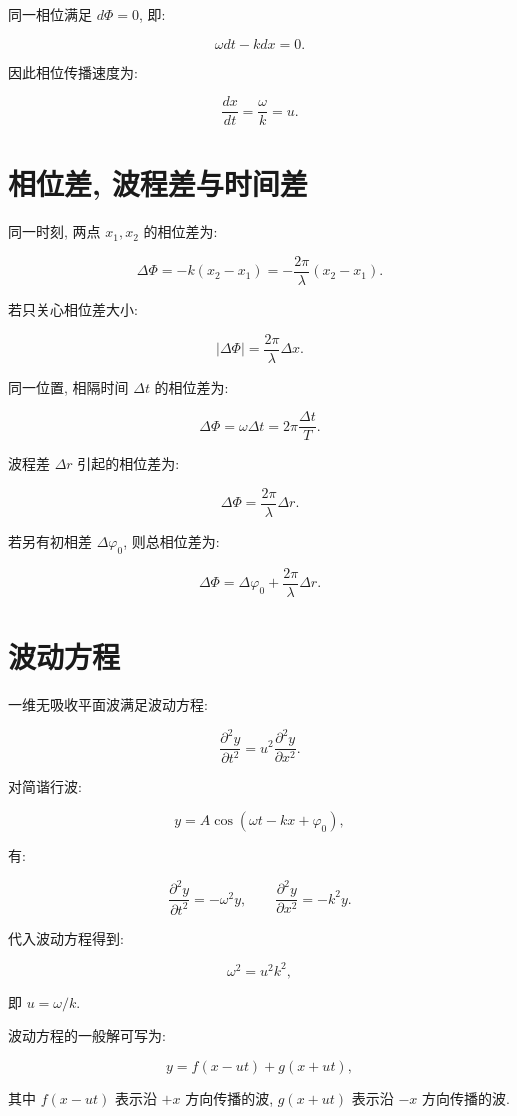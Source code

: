 \documentclass[
  a4paper,
]{ctexrep}
\begin{document}
同一相位满足 \(d\Phi=0\), 即:

\[
\omega dt-kdx=0.
\]

因此相位传播速度为:

\[
\frac{dx}{dt}=\frac{\omega}{k}=u.
\]

\section{相位差,
波程差与时间差}\label{ux76f8ux4f4dux5dee-ux6ce2ux7a0bux5deeux4e0eux65f6ux95f4ux5dee}

同一时刻, 两点 \(x_1,x_2\) 的相位差为:

\[
\Delta\Phi=-k(x_2-x_1)=-\frac{2\pi}{\lambda}(x_2-x_1).
\]

若只关心相位差大小:

\[
|\Delta\Phi|=\frac{2\pi}{\lambda}\Delta x.
\]

同一位置, 相隔时间 \(\Delta t\) 的相位差为:

\[
\Delta\Phi=\omega\Delta t=2\pi\frac{\Delta t}{T}.
\]

波程差 \(\Delta r\) 引起的相位差为:

\[
\Delta\Phi=\frac{2\pi}{\lambda}\Delta r.
\]

若另有初相差 \(\Delta\varphi_0\), 则总相位差为:

\[
\Delta\Phi=\Delta\varphi_0+\frac{2\pi}{\lambda}\Delta r.
\]

\section{波动方程}\label{ux6ce2ux52a8ux65b9ux7a0b}

一维无吸收平面波满足波动方程:

\[
\frac{\partial^2 y}{\partial t^2}=u^2\frac{\partial^2 y}{\partial x^2}.
\]

对简谐行波:

\[
y=A\cos(\omega t-kx+\varphi_0),
\]

有:

\[
\frac{\partial^2y}{\partial t^2}=-\omega^2y,
\qquad
\frac{\partial^2y}{\partial x^2}=-k^2y.
\]

代入波动方程得到:

\[
\omega^2=u^2k^2,
\]

即 \(u=\omega/k\).

波动方程的一般解可写为:

\[
y=f(x-ut)+g(x+ut),
\]

其中 \(f(x-ut)\) 表示沿 \(+x\) 方向传播的波, \(g(x+ut)\) 表示沿 \(-x\)
方向传播的波.
\end{document}
